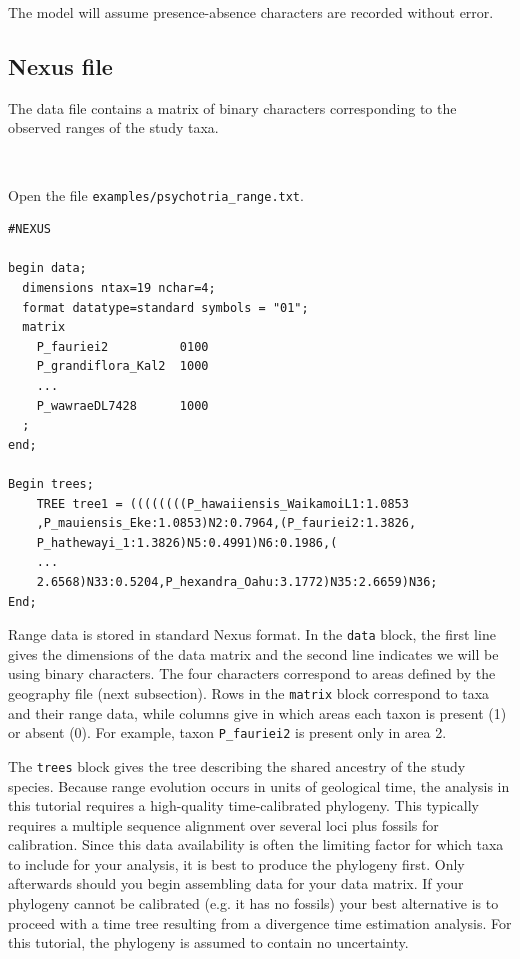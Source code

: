 \documentclass[11pt]{article}
\newcommand{\impmark}{\strut\vadjust{\domark}}
\newcommand{\domark}{%
  \vbox to 0pt{
    \kern-\dp\strutbox
    \smash{\llap{$\rightarrow$\kern1em}}
    \vss
  }%
}
\begin{document}
The model will assume presence-absence characters are recorded without error.

\subsection{Nexus file}

The data file contains a matrix of binary characters corresponding to the observed ranges of the study taxa.

\noindent \\ \impmark  Open the file \texttt{examples/psychotria\_range.txt}.

\begin{framed}
\begin{lstlisting}
#NEXUS

begin data;
  dimensions ntax=19 nchar=4;
  format datatype=standard symbols = "01";
  matrix
    P_fauriei2          0100
    P_grandiflora_Kal2  1000
    ...
    P_wawraeDL7428      1000	
  ;
end;

Begin trees;
	TREE tree1 = ((((((((P_hawaiiensis_WaikamoiL1:1.0853
	,P_mauiensis_Eke:1.0853)N2:0.7964,(P_fauriei2:1.3826,
	P_hathewayi_1:1.3826)N5:0.4991)N6:0.1986,(
	...
	2.6568)N33:0.5204,P_hexandra_Oahu:3.1772)N35:2.6659)N36;
End;
\end{lstlisting}
\end{framed}

Range data is stored in standard Nexus format.
In the {\tt data} block, the first line gives the dimensions of the data matrix and the second line indicates we will be using binary characters.
The four characters correspond to areas defined by the geography file (next subsection).
Rows in the {\tt matrix} block correspond to taxa and their range data, while columns give in which areas each taxon is present (1) or absent (0).
For example, taxon {\tt P\_fauriei2} is present only in area 2.

The {\tt trees} block gives the tree describing the shared ancestry of the study species.
Because range evolution occurs in units of geological time, the analysis in this tutorial requires a high-quality time-calibrated phylogeny.
This typically requires a multiple sequence alignment over several loci plus fossils for calibration.
Since this data availability is often the limiting factor for which taxa to include for your analysis, it is best to produce the phylogeny first.
Only afterwards should you begin assembling data for your data matrix.
If your phylogeny cannot be calibrated (e.g. it has no fossils) your best alternative is to proceed with a time tree resulting from a divergence time estimation analysis.
For this tutorial, the phylogeny is assumed to contain no uncertainty.
\end{document}
